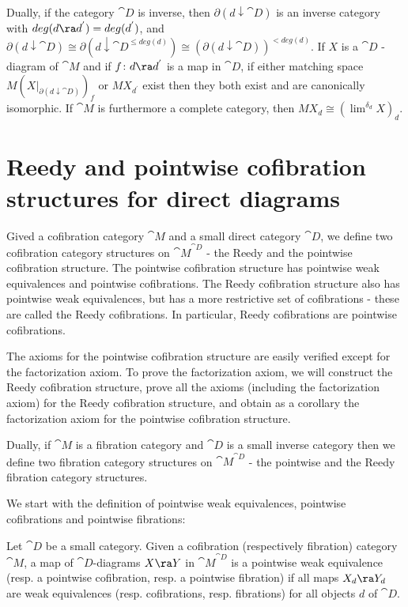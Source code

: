 Dually, if the category ${\cat D}$ is inverse, then $\partial(d \downarrow {\cat D})$ is an inverse category with $deg(d \ra d^{'}) = deg (d^{'})$, and $\partial(d \downarrow {\cat D}) \cong \partial(d \downarrow {\cat D}^{\leq deg(d)}) \cong (\partial(d \downarrow {\cat D}))^{< deg(d)}$. If $X$ is a ${\cat D}$ -diagram of ${\cat M}$ and if $f \colon d \ra d^{'}$ is a map in ${\cat D}$, if either matching space $M(X|_{\partial(d \downarrow {\cat D})})_f$ or $MX_{d^{'}}$ exist then they both exist and are canonically isomorphic. If ${\cat M}$ is furthermore a complete category, then $MX_d \cong (\lim^{\delta_d} X)_d$.

\section{Reedy and pointwise cofibration structures for direct diagrams}
\label{sec:reedycofstruct}

Gived a cofibration category ${\cat M}$ and a small direct category ${\cat D}$, we define two cofibration category structures on ${\cat M}^{\cat D}$ - the Reedy and the pointwise cofibration structure. The pointwise cofibration structure has pointwise weak equivalences and pointwise cofibrations. The Reedy cofibration structure also has pointwise weak equivalences, but has a more restrictive set of cofibrations - these are called the Reedy cofibrations. In particular, Reedy cofibrations are pointwise cofibrations.

The axioms for the pointwise cofibration structure are easily verified except for the factorization axiom. To prove the factorization axiom, we will construct the Reedy cofibration structure, prove all the axioms (including the factorization axiom) for the Reedy cofibration structure, and obtain as a corollary the factorization axiom for the pointwise cofibration structure.

Dually, if ${\cat M}$ is a fibration category and ${\cat D}$ is a small inverse category then we define two fibration category structures on ${\cat M}^{\cat D}$ - the pointwise and the Reedy fibration category structures. 

We start with the definition of pointwise weak equivalences, pointwise cofibrations and pointwise fibrations:

\begin{defn}
\label{def:pointwisecof}
Let ${\cat D}$ be a small category. Given a cofibration (respectively fibration) category ${\cat M}$, a map of ${\cat D}$-diagrams $X \ra Y$ in ${\cat M}^{\cat D}$ is a pointwise weak equivalence (resp. a pointwise cofibration, resp. a pointwise fibration) if all maps $X_d \ra Y_d$ are weak equivalences (resp. cofibrations, resp. fibrations) for all objects $d$ of ${\cat D}$.
\end{defn}


